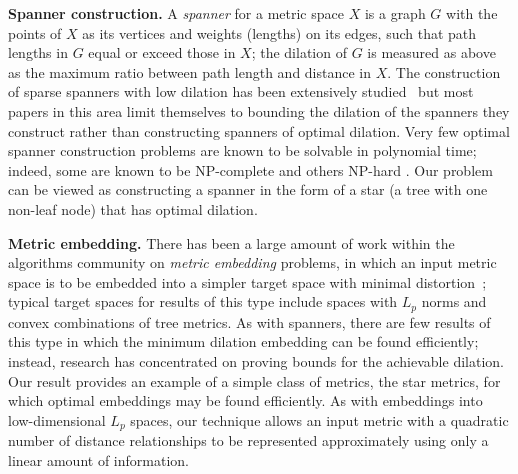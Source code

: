 \documentclass{llncs}
\begin{document}
\smallskip\noindent
{\bf Spanner construction.} A \emph{spanner} for a metric space $X$ is a graph $G$ with the points of $X$ as its vertices and weights (lengths) on its edges, such that path lengths in $G$ equal or exceed those in $X$; the dilation of $G$ is measured as above as the maximum ratio between path length and distance in $X$. The construction of sparse spanners with low dilation has been extensively studied~\cite{Epp-HCG-00} but most papers in this area limit themselves to bounding the dilation of the spanners they construct rather than constructing spanners of optimal dilation.  Very few optimal spanner construction problems are known to be solvable in polynomial time; indeed, some are known to be NP-complete \cite{klein_kutz} and others NP-hard \cite{1273697,edmonds_2008}. Our problem can be viewed as constructing a spanner in the form of a star (a tree with one non-leaf node) that has optimal dilation.

\smallskip\noindent
{\bf Metric embedding.} There has been a large amount of work within the algorithms community on \emph{metric embedding} problems, in which an input metric space is to be embedded into a simpler target space with minimal distortion~\cite{Lin-ICM-02}; typical target spaces for results of this type include spaces with $L_p$ norms and convex combinations of tree metrics. As with spanners, there are few results of this type in which the minimum dilation embedding can be found efficiently; instead, research has concentrated on proving bounds for the achievable dilation. Our result provides an example of a simple class of metrics, the star metrics, for which optimal embeddings may be found efficiently. As with embeddings into low-dimensional $L_p$ spaces, our technique allows an input metric with a quadratic number of distance relationships to be represented approximately using only a linear amount of information.
\end{document}
